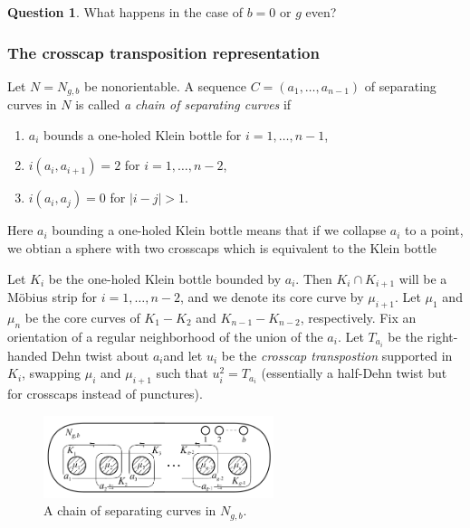 \documentclass[reqno]{amsart}
\theoremstyle{definition}
\newtheorem{question}[theorem]{Question}
\theoremstyle{remark}
\begin{document}
\begin{question}
    What happens in the case of
    $b=0$ or $g$ even?
\end{question}

\subsubsection{The crosscap transposition representation}

Let $N = N_{g,b}$ be nonorientable. A sequence
$C = \left( a_1, \ldots, a_{n-1} \right) $ of separating
curves in $N$ is called \textit{a chain of separating curves} if
\begin{enumerate}
    \item $a_i$ bounds a one-holed Klein bottle
        for $i = 1, \ldots, n-1$,
    \item $i \left( a_i, a_{i+1} \right) = 2$ for
        $i = 1,\ldots, n-2$,
    \item $i\left( a_i, a_j \right) = 0$ for
        $\left| i-j \right| > 1$.
\end{enumerate}


Here $a_i$ bounding a one-holed Klein bottle means
that if we collapse $a_i$ to a point, we obtian a 
sphere with two crosscaps which is equivalent to the Klein bottle


Let $K_i$ be the one-holed Klein bottle bounded by
$a_i$. Then $K_i \cap K_{i+1}$ will be a Möbius strip
for $i = 1, \ldots, n-2$, and we denote its core curve
by $\mu_{i+1}$. Let $\mu_1$ and $\mu_n$ be the core curves
of $K_1 - K_2$ and $K_{n-1} - K_{n-2}$, respectively.
Fix an orientation of a regular neighborhood of
the union of the $a_i$. Let $T_{a_i}$ be the right-handed
Dehn twist about $a_i$and let $u_i$ be the 
\textit{crosscap transpostion} supported
in $K_i$, swapping $\mu_i$ and $\mu_{i+1}$ such that
$u_i^2 = T_{a_i}$ (essentially a half-Dehn twist but for crosscaps
instead of punctures).

\begin{figure}[H]
    \centering
    \includegraphics[width=0.6\textwidth]{chain-separating-curves.png}
    \caption{A chain of separating curves in
    $N_{g,b}$.}
    \label{fig:chain-separating-curves-png}
\end{figure}
\end{document}
